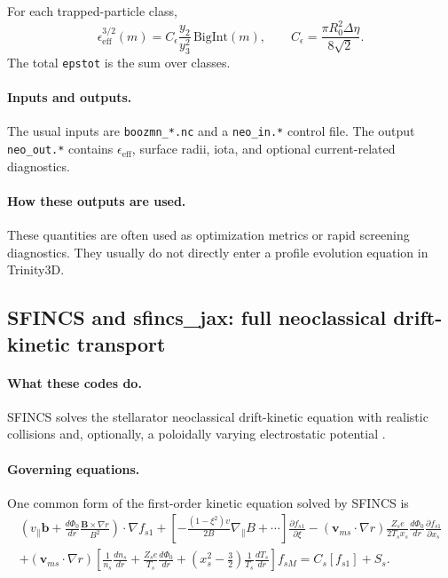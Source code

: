 \documentclass[11pt]{article}
\begin{document}
For each trapped-particle class,
\begin{equation}
\epsilon_{\mathrm{eff}}^{3/2}(m)
=
C_\epsilon \frac{y_2}{y_3^2}\,\mathrm{BigInt}(m),
\qquad
C_\epsilon=\frac{\pi R_0^2 \Delta\eta}{8\sqrt{2}}.
\end{equation}
The total \texttt{epstot} is the sum over classes.

\paragraph{Inputs and outputs.}
The usual inputs are \texttt{boozmn\_*.nc} and a \texttt{neo\_in.*} control
file. The output \texttt{neo\_out.*} contains $\epsilon_{\mathrm{eff}}$,
surface radii, iota, and optional current-related diagnostics.

\paragraph{How these outputs are used.}
These quantities are often used as optimization metrics or rapid screening
diagnostics. They usually do not directly enter a profile evolution equation in
Trinity3D.

\subsection{SFINCS and sfincs\_jax: full neoclassical drift-kinetic transport}

\paragraph{What these codes do.}
SFINCS solves the stellarator neoclassical drift-kinetic equation with realistic
collisions and, optionally, a poloidally varying electrostatic potential
\citep{Landreman2014SFINCS,Mollen2018,SFINCSRepo,SFINCSJaxRepo}.

\paragraph{Governing equations.}
One common form of the first-order kinetic equation solved by SFINCS is
\begin{align}
\left(
v_\parallel\mathbf{b}
+
\frac{d\Phi_0}{dr}\frac{\mathbf{B}\times\nabla r}{B^2}
\right)\cdot\nabla f_{s1}
+
\left[
-\frac{(1-\xi^2)v}{2B}\nabla_\parallel B + \cdots
\right]\frac{\partial f_{s1}}{\partial \xi}
- (\mathbf{v}_{ms}\cdot\nabla r)\frac{Z_s e}{2T_s x_s}\frac{d\Phi_0}{dr}\frac{\partial f_{s1}}{\partial x_s}
\nonumber\\
+
(\mathbf{v}_{ms}\cdot\nabla r)
\left[
\frac{1}{n_s}\frac{dn_s}{dr}
+
\frac{Z_s e}{T_s}\frac{d\Phi_0}{dr}
+
\left(x_s^2-\frac{3}{2}\right)\frac{1}{T_s}\frac{dT_s}{dr}
\right]f_{sM}
=
C_s[f_{s1}] + S_s.
\end{align}
\end{document}
